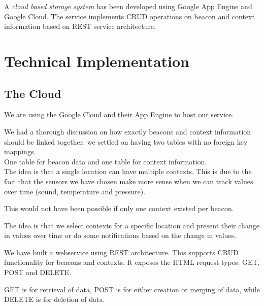 \documentclass{sigchi}
\begin{document}
A \textit{cloud based storage system} has been developed using Google App Engine and Google Cloud. The service implements CRUD operations on beacon and context information based on REST service architecture.

\section{Technical Implementation}
\subsection{The Cloud}
We are using the Google Cloud and their App Engine to host our service.

We had a thorough discussion on how exactly beacons and context information should be linked together, we settled on having two tables with no foreign key mappings.\\
One table for beacon data and one table for context information.\\

The idea is that a single location can have multiple contexts. This is due to the fact that the sensors we have chosen make more sense when we can track values over time (sound, temperature and pressure).

This would not have been possible if only one context existed per beacon.

The idea is that we select contexts for a specific location and present their change in values over time or do some notifications based on the change in values.




We have built a webservice using REST architecture. This supports CRUD functionality for beacons and contexts.
It exposes the HTML request types: GET, POST and DELETE.

GET is for retrieval of data, POST is for either creation or merging of data, while DELETE is for deletion of data.
\end{document}

